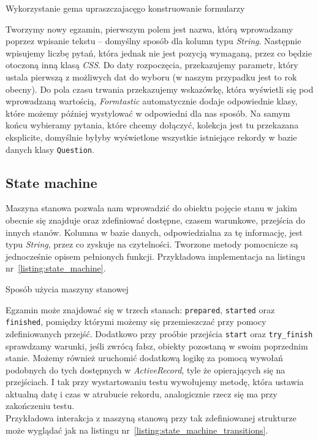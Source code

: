 \documentclass[12pt,twoside]{report}
\begin{document}
\begin{listing}
  
  \caption{Wykorzystanie gema upraszczajacęgo konstruowanie formularzy}
  \label{listing:formtastic}
\end{listing}


Tworzymy nowy egzamin, pierwszym polem jest nazwa, którą wprowadzamy poprzez wpisanie
tekstu -- domyślny sposób dla kolumn typu \emph{String}. Następnie wpisujemy liczbę pytań,
która jednak nie jest pozycją wymaganą, przez co będzie otoczoną inną klasą \emph{CSS}.
Do daty rozpoczęcia, przekazujemy parametr, który ustala pierwszą z możliwych dat do
wyboru (w naszym przypadku jest to rok obecny). Do pola czasu trwania przekazujemy
wskazówkę, która wyświetli się pod wprowadzaną wartością, \emph{Formtastic} automatycznie
dodaje odpowiednie klasy, które możemy później wystylować w odpowiedni dla nas sposób. Na
samym końcu wybieramy pytania, które chcemy dołączyć, kolekcja jest tu przekazana
eksplicite, domyślnie byłyby wyświetlone wszystkie istniejące rekordy w bazie danych klasy
\texttt{Question}.

\subsection{State machine}\label{sec:state_machine}
Maszyna stanowa pozwala nam wprowadzić do obiektu pojęcie stanu w jakim obecnie się
znajduje oraz zdefiniować dostępne, czasem warunkowe, przejścia do innych stanów. Kolumna
w bazie danych, odpowiedzialna za tę informację, jest typu \emph{String}, przez co
zyskuje na czytelności. Tworzone metody pomocnicze są jednocześnie opisem pełnionych
funkcji. Przykładowa implementacja na listingu nr~\ref{listing:state_machine}.

\begin{listing}
  
  \caption{Sposób użycia maszyny stanowej}
  \label{listing:state_machine}
\end{listing}


Egzamin może znajdować się w trzech stanach: \texttt{prepared}, \texttt{started} oraz
\texttt{finished}, pomiędzy którymi możemy się przemieszczać przy pomocy zdefiniowanych
przejść. Dodatkowo przy proóbie przejścia \texttt{start} oraz \texttt{try\_finish}
sprawdzamy warunki, jeśli zwrócą fałsz, obiekty pozostaną w swoim poprzednim stanie.
Możemy również uruchomić dodatkową logikę za pomocą wywołań podobnych do tych dostępnych w
\emph{ActiveRecord}, tyle że opierających się na przejściach. I tak przy wystartowaniu
testu wywołujemy metodę, która ustawia aktualną datę i czas w atrubucie rekordu,
analogicznie rzecz się ma przy zakończeniu testu.\\
Przykładowa interakcja z maszyną stanową przy tak zdefiniowanej strukturze może wyglądać
jak na listingu nr~\ref{listing:state_machine_transitions}.
\end{document}
